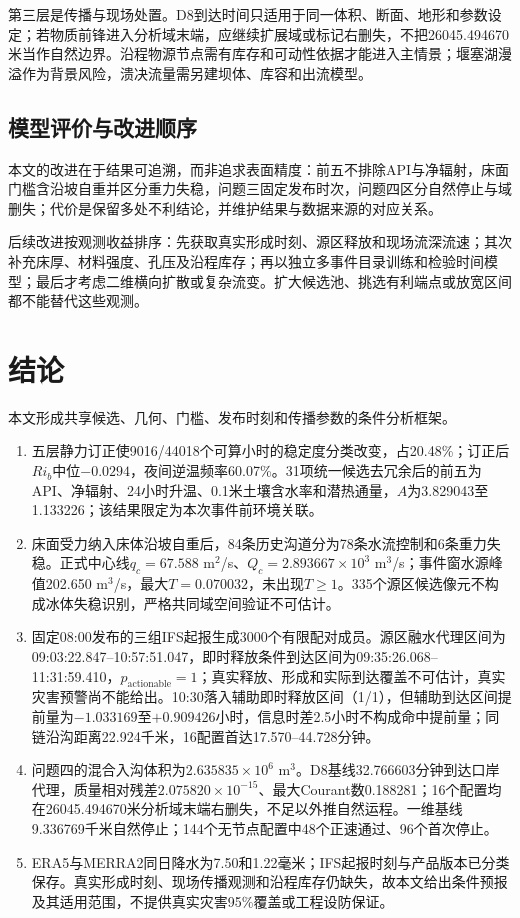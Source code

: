 第三层是传播与现场处置。D8到达时间只适用于同一体积、断面、地形和参数设定；若物质前锋进入分析域末端，应继续扩展域或标记右删失，不把26045.494670米当作自然边界。沿程物源节点需有库存和可动性依据才能进入主情景；堰塞湖漫溢作为背景风险，溃决流量需另建坝体、库容和出流模型。

\subsection{模型评价与改进顺序}
本文的改进在于结果可追溯，而非追求表面精度：前五不排除API与净辐射，床面门槛含沿坡自重并区分重力失稳，问题三固定发布时次，问题四区分自然停止与域删失；代价是保留多处不利结论，并维护结果与数据来源的对应关系。

后续改进按观测收益排序：先获取真实形成时刻、源区释放和现场流深流速；其次补充床厚、材料强度、孔压及沿程库存；再以独立多事件目录训练和检验时间模型；最后才考虑二维横向扩散或复杂流变。扩大候选池、挑选有利端点或放宽区间都不能替代这些观测。

\section{结论}
本文形成共享候选、几何、门槛、发布时刻和传播参数的条件分析框架。
\begin{enumerate}
\item 五层静力订正使9016/44018个可算小时的稳定度分类改变，占20.48\%；订正后$Ri_b$中位$-0.0294$，夜间逆温频率60.07\%。31项统一候选去冗余后的前五为API、净辐射、24小时升温、0.1米土壤含水率和潜热通量，$A$为3.829043至1.133226；该结果限定为本次事件前环境关联。
\item 床面受力纳入床体沿坡自重后，84条历史沟道分为78条水流控制和6条重力失稳。正式中心线$q_c=67.588$ m$^2$/s、$Q_c=2.893667\times10^3$ m$^3$/s；事件窗水源峰值202.650 m$^3$/s，最大$T=0.070032$，未出现$T\ge1$。335个源区候选像元不构成冰体失稳识别，严格共同域空间验证不可估计。
\item 固定08:00发布的三组IFS起报生成3000个有限配对成员。源区融水代理区间为09:03:22.847--10:57:51.047，即时释放条件到达区间为09:35:26.068--11:31:59.410，$p_{\mathrm{actionable}}=1$；真实释放、形成和实际到达覆盖不可估计，真实灾害预警尚不能给出。10:30落入辅助即时释放区间（1/1），但辅助到达区间提前量为$-1.033169$至$+0.909426$小时，信息时差2.5小时不构成命中提前量；同链沿沟距离22.924千米，16配置首达17.570--44.728分钟。
\item 问题四的混合入沟体积为$2.635835\times10^6$ m$^3$。D8基线32.766603分钟到达口岸代理，质量相对残差$2.075820\times10^{-15}$、最大Courant数0.188281；16个配置均在26045.494670米分析域末端右删失，不足以外推自然运程。一维基线9.336769千米自然停止；144个无节点配置中48个正速通过、96个首次停止。
\item ERA5与MERRA2同日降水为7.50和1.22毫米；IFS起报时刻与产品版本已分类保存。真实形成时刻、现场传播观测和沿程库存仍缺失，故本文给出条件预报及其适用范围，不提供真实灾害95\%覆盖或工程设防保证。
\end{enumerate}
